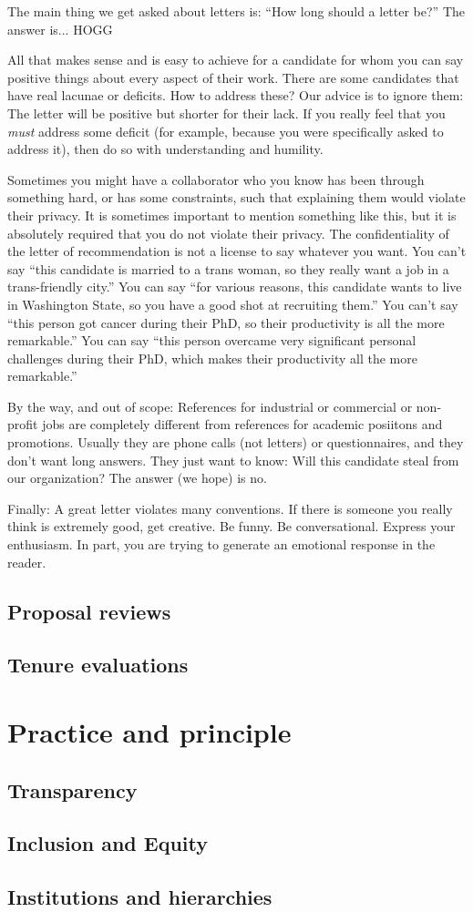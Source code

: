 \documentclass[letterpaper]{book}
\begin{document}
The main thing we get asked about letters is: ``How long should a letter be?''
The answer is... HOGG

All that makes sense and is easy to achieve for a candidate for whom you can say positive things about every aspect of their work.
There are some candidates that have real lacunae or deficits.
How to address these?
Our advice is to ignore them:
The letter will be positive but shorter for their lack.
If you really feel that you \emph{must} address some deficit (for example, because you were specifically asked to address it),
then do so with understanding and humility.

Sometimes you might have a collaborator who you know has been through something hard, or has some constraints, such that explaining them would violate their privacy.
It is sometimes important to mention something like this, but it is absolutely required that you do not violate their privacy.
The confidentiality of the letter of recommendation is not a license to say whatever you want.
You can't say ``this candidate is married to a trans woman, so they really want a job in a trans-friendly city.''
You can say ``for various reasons, this candidate wants to live in Washington State, so you have a good shot at recruiting them.''
You can't say ``this person got cancer during their PhD, so their productivity is all the more remarkable.''
You can say ``this person overcame very significant personal challenges during their PhD, which makes their productivity all the more remarkable.''

By the way, and out of scope: References for industrial or commercial or non-profit jobs are completely different from references for academic posiitons and promotions.
Usually they are phone calls (not letters) or questionnaires, and they don't want long answers.
They just want to know: Will this candidate steal from our organization?
The answer (we hope) is no.

Finally: A great letter violates many conventions.
If there is someone you really think is extremely good, get creative.
Be funny.
Be conversational.
Express your enthusiasm.
In part, you are trying to generate an emotional response in the reader.

\chapter{Proposal reviews}

\chapter{Tenure evaluations}

\part{Practice and principle}

\chapter{Transparency}

\chapter{Inclusion and Equity}

\chapter{Institutions and hierarchies}
\end{document}
